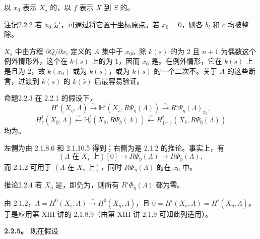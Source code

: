以 $x_0$ 表示 $X_s$ 的，以 $f$ 表示 $X$ 到 $S$ 的。
\begin{SGAresult}{注记}{2.2.2}
若 $x_0$ 是，可通过将它置于坐标原点。若 $x_0=0$，则各 $b_i$ 和 $c$ 均被整除。

$X_s$ 中由方程 $\partial Q/\partial x_i$ 定义的 $A$ 集中于 $x_0$。除 $k(s)$ 的为 $2$ 且 $n+1$ 为偶数这个例外情形外，这个在 $k(s)$ 上的为 $1$，因而 $x_0$ 是。在例外情形，它在 $k(s)$ 上是且为 $2$，故 $k(x_0)$ 或为 $k(s)$，或为 $k(s)$ 的一个二次不。关于 $A$ 的这些断言，过渡到 $k(s)$ 的 $k(\bar s)$ 后最容易验证。
\end{SGAresult}
\begin{SGAresult}{命题}{2.2.3}
在 2.2.1 的假设下，
\[
 H^i(X_{\bar\eta},\Lambda)\xrightarrow{\sim}
 \mathbb H^i(X_{\bar s},R\Psi_{\bar\eta}(\Lambda))\xrightarrow{\sim}
 R^i\Psi_{\bar\eta}(\Lambda)_{x_0},
\]
\[
 H_c^i(X_{\bar\eta},\Lambda)\xleftarrow{\sim}
 \mathbb H_c^i(X_{\bar s},R\Psi_{\bar\eta}(\Lambda))\xleftarrow{\sim}
 H^i_{\{x_0\}}(X_{\bar s},R\Psi_{\bar\eta}(\Lambda))
\]
均为。
\end{SGAresult}
左侧为由 2.1.8.6 和 2.1.10.5 得到；右侧为是 2.1.2 的推论。事实上，有
\[
 (\Lambda\text{ 在 }X_{\bar s}\text{ 上})[0]\longrightarrow
 R\Psi_{\bar\eta}(\Lambda)\longrightarrow R\Phi_{\bar\eta}(\Lambda),
\]
而 2.1.2 可用于 $(\Lambda\text{ 在 }X_{\bar s}\text{ 上})$，同时 $R\Phi_{\bar\eta}(\Lambda)$ 的在 $x_0$ 中。
\begin{SGAresult}{推论}{2.2.4}
若 $X_{\bar\eta}$ 是，即仍为，则所有 $R^i\Phi_{\bar\eta}(\Lambda)$ 都为零。
\end{SGAresult}
由 2.1.2，$\Lambda=H^0(X_{\bar s},\Lambda)\xrightarrow{\sim}H^0(X_{\bar\eta},\Lambda)$，且 $0=H^i(X_{\bar s},\Lambda)=H^i(X_{\bar\eta},\Lambda)$。于是应用第 XIII 讲的 2.1.8.9（由第 XIII 讲 2.1.9 可知此列适用）。

\textbf{2.2.5。} 现在假设

